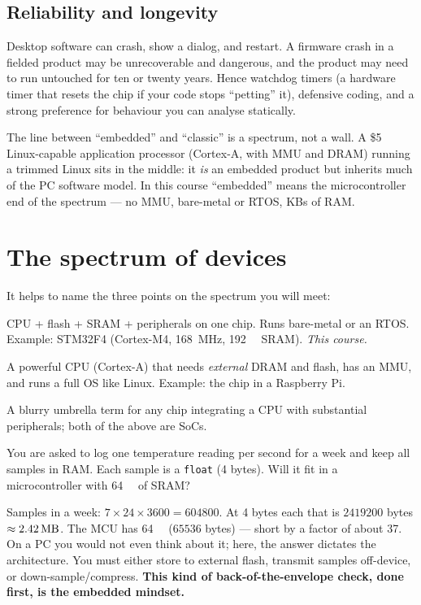 \documentclass[11pt,a4paper,oneside]{book}
\newcommand{\code}[1]{\texttt{#1}}
\begin{document}
\subsection{Reliability and longevity}
Desktop software can crash, show a dialog, and restart. A firmware crash in a
fielded product may be unrecoverable and dangerous, and the product may need to
run untouched for ten or twenty years. Hence watchdog timers (a hardware timer
that resets the chip if your code stops ``petting'' it), defensive coding, and
a strong preference for behaviour you can analyse statically.

\begin{note}
The line between ``embedded'' and ``classic'' is a spectrum, not a wall. A
\$5 Linux-capable application processor (Cortex-A, with MMU and DRAM) running a
trimmed Linux sits in the middle: it \emph{is} an embedded product but
inherits much of the PC software model. In this course ``embedded'' means the
microcontroller end of the spectrum --- no MMU, bare-metal or RTOS, KBs of RAM.
\end{note}

\section{The spectrum of devices}

It helps to name the three points on the spectrum you will meet:
\begin{description}[leftmargin=1.6cm,style=nextline]
  \item[MCU --- microcontroller] CPU + flash + SRAM + peripherals on one chip.
        Runs bare-metal or an RTOS. Example: STM32F4 (Cortex-M4,
        \qty{168}{\mega\hertz}, \qty{192}{\kilo\byte} SRAM). \emph{This course.}
  \item[MPU --- microprocessor / application processor] A powerful CPU
        (Cortex-A) that needs \emph{external} DRAM and flash, has an MMU, and
        runs a full OS like Linux. Example: the chip in a Raspberry Pi.
  \item[SoC --- system-on-chip] A blurry umbrella term for any chip integrating
        a CPU with substantial peripherals; both of the above are SoCs.
\end{description}

\begin{wexample}
You are asked to log one temperature reading per second for a week and keep all
samples in RAM. Each sample is a \code{float} (4 bytes). Will it fit in a
microcontroller with \qty{64}{\kilo\byte} of SRAM?

\smallskip
Samples in a week: $7 \times 24 \times 3600 = \num{604800}$. At 4 bytes each
that is $\num{2419200}$ bytes $\approx \qty{2.42}{\mega\byte}$. The MCU has
\qty{64}{\kilo\byte} ($\num{65536}$ bytes) --- short by a factor of about 37.
On a PC you would not even think about it; here,
the answer dictates the architecture. You must either store to external flash,
transmit samples off-device, or down-sample/compress. \textbf{This kind of
back-of-the-envelope check, done first, is the embedded mindset.}
\end{wexample}
\end{document}
